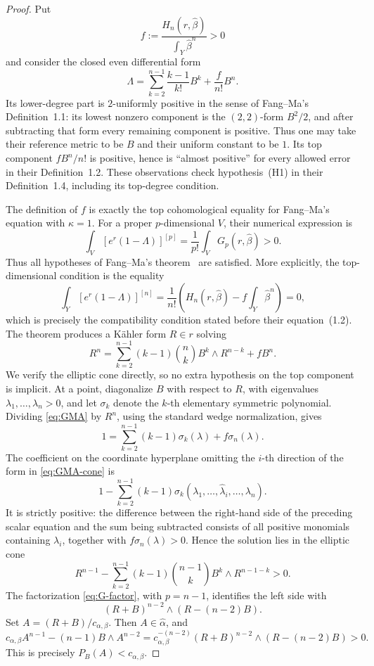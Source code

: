\documentclass[reqno]{amsart}
\newcommand{\cab}{c_{\alpha,\beta}}
\theoremstyle{plain}
\theoremstyle{remark}
\begin{document}
\begin{proof}
Put
\[
 f:=\frac{H_n(r,\widehat\beta)}
          {\int_Y\widehat\beta^n}>0
\]
and consider the closed even differential form
\begin{equation}\label{eq:Lambda-FM}
 \Lambda
 =
 \sum_{k=2}^{n-1}\frac{k-1}{k!}B^k
 +\frac f{n!}B^n.
\end{equation}
Its lower-degree part is $2$-uniformly positive in the sense of
Fang--Ma's Definition~1.1: its lowest nonzero component is the
$(2,2)$-form $B^2/2$, and after subtracting that form every
remaining component is positive.  Thus one may take their reference
metric to be $B$ and their uniform constant to be $1$.  Its top
component $fB^n/n!$ is positive, hence is ``almost positive'' for
every allowed error in their Definition~1.2.  These observations check
hypothesis~(H1) in their Definition~1.4, including its top-degree
condition.

The definition of $f$ is exactly the top cohomological equality for
Fang--Ma's equation with $\kappa=1$.  For a proper
$p$-dimensional $V$, their numerical expression is
\[
 \int_V[e^r(1-\Lambda)]^{[p]}
 =\frac1{p!}\int_V G_p(r,\widehat\beta)>0.
\]
Thus all hypotheses of Fang--Ma's theorem~\cite[Theorem~1.10]{FM24}
are satisfied. More explicitly, the top-dimensional
condition is the equality
\[
 \int_Y[e^r(1-\Lambda)]^{[n]}
 =\frac1{n!}\left(H_n(r,\widehat\beta)
 -f\int_Y\widehat\beta^n\right)=0,
\]
which is precisely the compatibility condition stated before their
equation~(1.2).  The theorem produces a K\"ahler form $R\in r$
solving
\begin{equation}\label{eq:GMA}
 R^n=
 \sum_{k=2}^{n-1}(k-1)\binom nk
 B^k\wedge R^{n-k}+fB^n.
\end{equation}
We verify the elliptic cone directly, so no extra hypothesis on the top
component is implicit. At a point, diagonalize $B$ with respect to
$R$, with eigenvalues $\lambda_1,\ldots,\lambda_n>0$, and let
$\sigma_k$ denote the $k$-th elementary symmetric polynomial. Dividing
\eqref{eq:GMA} by $R^n$, using the standard wedge normalization,
gives
\[
 1=\sum_{k=2}^{n-1}(k-1)\sigma_k(\lambda)
      +f\sigma_n(\lambda).
\]
The coefficient on the coordinate hyperplane omitting the $i$-th
direction of the form in \eqref{eq:GMA-cone} is
\[
 1-\sum_{k=2}^{n-1}(k-1)
 \sigma_k(\lambda_1,\ldots,\widehat\lambda_i,\ldots,\lambda_n).
\]
It is strictly positive: the difference between the right-hand side of the
preceding scalar equation and the sum being subtracted consists of all
positive monomials containing $\lambda_i$, together with
$f\sigma_n(\lambda)>0$.  Hence the solution lies in the elliptic cone
\begin{equation}\label{eq:GMA-cone}
 R^{n-1}
 -\sum_{k=2}^{n-1}(k-1)\binom{n-1}{k}
 B^k\wedge R^{n-1-k}>0.
\end{equation}
The factorization \eqref{eq:G-factor}, with $p=n-1$, identifies the
left side with
\[
 (R+B)^{n-2}\wedge(R-(n-2)B).
\]
Set $A=(R+B)/\cab$.  Then $A\in\widehat\alpha$, and
\[
 \cab A^{n-1}-(n-1)B\wedge A^{n-2}
 =
 \cab^{-(n-2)}
 (R+B)^{n-2}\wedge(R-(n-2)B)>0.
\]
This is precisely $P_B(A)<\cab$.
\end{proof}
\end{document}
